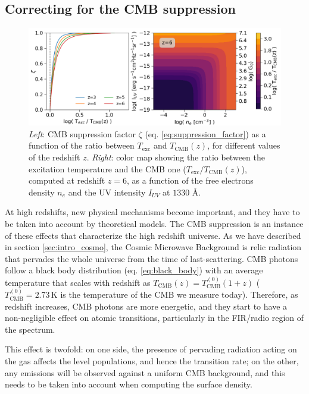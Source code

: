 \subsection{Correcting for the CMB suppression}\label{sec:CMB_suppression}


\begin{figure}
    \centering
    \includegraphics[width=1.\textwidth]{plots/cmb_theory.png}


    \caption{\textit{Left}: CMB suppression factor $\zeta$ (eq. \ref{eq:suppression_factor}) as a function of the ratio between $T_\mathrm{exc}$ and $T_\mathrm{CMB}(z)$, for different values of the redshift $z$. \textit{Right}: color map showing the ratio between the excitation temperature and the CMB one ($T_\mathrm{exc}/T_\mathrm{CMB}(z)$), computed at redshift $z=6$, as a function of the free electrons density $n_e$ and the UV intensity $I_{UV}$ at $1330$ \AA.
    \label{fig:cmb_intro}
    }
\end{figure}


At high redshifts, new physical mechanisms become important, and they have to be taken into account by theoretical models. The CMB suppression is an instance of these effects that characterize the high redshift universe. As we have described in section \ref{sec:intro_cosmo}, the Cosmic Microwave Background is relic radiation that pervades the whole universe from the time of last-scattering. CMB photons follow a black body distribution  (eq. \ref{eq:black_body}) with an average temperature that scales with redshift as $T_\mathrm{CMB}(z) = T^{(0)}_\mathrm{CMB} (1+z)$ ($T^{(0)}_\mathrm{CMB}=2.73\,\mathrm{K}$ is the temperature of the CMB we measure today). Therefore, as redshift increases, CMB photons are more energetic, and they start to have a non-negligible effect on atomic transitions, particularly in the FIR/radio region of the spectrum. 

This effect is twofold: on one side, the presence of pervading radiation acting on the gas affects the level populations, and hence the \CII transition rate; on the other, any \CII emissions will be observed against a uniform CMB background, and this needs to be taken into account when computing the \CII surface density. 

